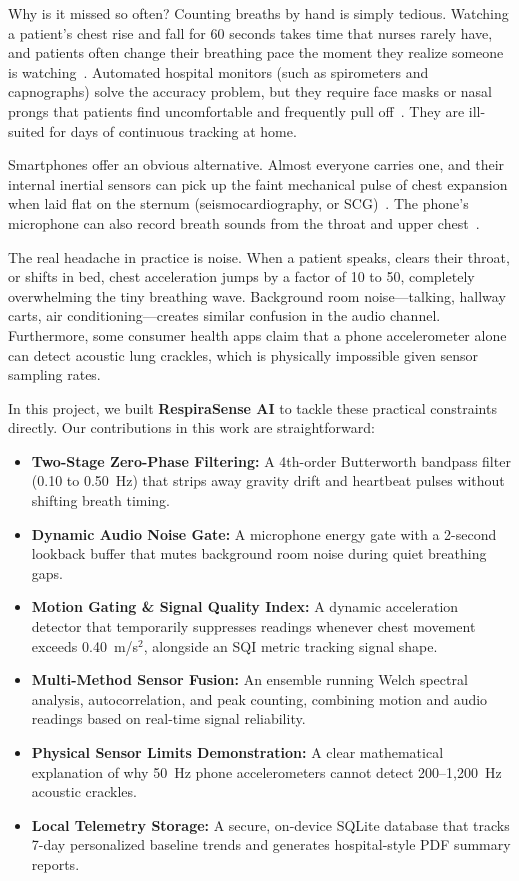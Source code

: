 \documentclass[journal]{IEEEtran}
\begin{document}
Why is it missed so often? Counting breaths by hand is simply tedious. Watching a patient's chest rise and fall for 60 seconds takes time that nurses rarely have, and patients often change their breathing pace the moment they realize someone is watching~\cite{lovett2019}. Automated hospital monitors (such as spirometers and capnographs) solve the accuracy problem, but they require face masks or nasal prongs that patients find uncomfortable and frequently pull off~\cite{folke2003}. They are ill-suited for days of continuous tracking at home.

Smartphones offer an obvious alternative. Almost everyone carries one, and their internal inertial sensors can pick up the faint mechanical pulse of chest expansion when laid flat on the sternum (seismocardiography, or SCG)~\cite{topol2019, dirienzo2018}. The phone's microphone can also record breath sounds from the throat and upper chest~\cite{alshaer2020}.

The real headache in practice is noise. When a patient speaks, clears their throat, or shifts in bed, chest acceleration jumps by a factor of 10 to 50, completely overwhelming the tiny breathing wave. Background room noise—talking, hallway carts, air conditioning—creates similar confusion in the audio channel. Furthermore, some consumer health apps claim that a phone accelerometer alone can detect acoustic lung crackles, which is physically impossible given sensor sampling rates.

In this project, we built \textbf{RespiraSense AI} to tackle these practical constraints directly. Our contributions in this work are straightforward:
\begin{itemize}
    \item \textbf{Two-Stage Zero-Phase Filtering:} A 4th-order Butterworth bandpass filter (0.10 to 0.50~Hz) that strips away gravity drift and heartbeat pulses without shifting breath timing.
    \item \textbf{Dynamic Audio Noise Gate:} A microphone energy gate with a 2-second lookback buffer that mutes background room noise during quiet breathing gaps.
    \item \textbf{Motion Gating \& Signal Quality Index:} A dynamic acceleration detector that temporarily suppresses readings whenever chest movement exceeds 0.40~m/s$^2$, alongside an SQI metric tracking signal shape.
    \item \textbf{Multi-Method Sensor Fusion:} An ensemble running Welch spectral analysis, autocorrelation, and peak counting, combining motion and audio readings based on real-time signal reliability.
    \item \textbf{Physical Sensor Limits Demonstration:} A clear mathematical explanation of why 50~Hz phone accelerometers cannot detect 200--1,200~Hz acoustic crackles.
    \item \textbf{Local Telemetry Storage:} A secure, on-device SQLite database that tracks 7-day personalized baseline trends and generates hospital-style PDF summary reports.
\end{itemize}
\end{document}

